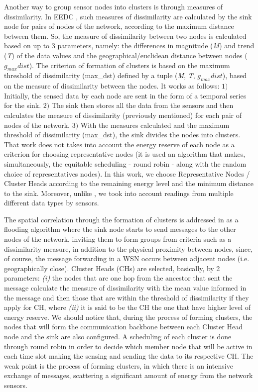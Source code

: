 \documentclass{acm_proc_article-sp}
\begin{document}
Another way to group sensor nodes into clusters is through measures of
dissimilarity.
In EEDC \cite{Liu2007}, such measures of dissimilarity are calculated by the
sink node for pairs of nodes of the network, according to the maximum distance
between them.
So, the measure of dissimilarity between two nodes is calculated based on up to
$3$ parameters, namely:
the differences in magnitude (\textit{M}) and trend (\textit{T}) of the data
values and the geographical/euclidean distance between nodes ($g_{max}dist$).
The criterion of formation of clusters is based on the maximum threshold of
dissimilarity (max\_dst) defined by a tuple (\textit{M}, \textit{T},
$g_{max}dist$), based on the measure of dissimilarity between the nodes. It
works as follows: $1)$ Initially, the sensed data by each node are sent in the
form of a temporal series for the sink. $2)$ The sink then stores all the data
from the sensors and then calculates the measure of dissimilarity (previously
mentioned) for each pair of nodes of the network. $3)$ With the measures
calculated and the maximum threshold of dissimilarity (max\_dst), the sink
divides the nodes into clusters. 
That work does not takes into account the energy reserve of each node as a
criterion for choosing representative nodes (it is used an algorithm that makes,
simultaneously, the equitable scheduling - round robin - along with the random
choice of representatives nodes). In this work, we choose Representative Nodes /
Cluster Heads according to the remaining energy level and the minimum distance
to the sink. Moreover, unlike \cite{Liu2007}, we took into account readings from
multiple different data types by sensors.

The spatial correlation through the formation of clusters is addressed in
\cite{Pham2010} as a flooding algorithm where the sink node starts to
send messages to the other nodes of the network, inviting them to form groups
from criteria such as a dissimilarity measure, in addition to the physical
proximity between nodes, since, of course, the message forwarding in a WSN
occurs between adjacent nodes (i.e. geographically close). Cluster Heads (CHs)
are selected, basically, by 2 parameters: {\it (i)} the nodes that are one hop
from the ancestor that sent the message calculate the measure of dissimilarity
with the mean value informed in the message and then those that are within the
threshold of dissimilarity if they apply for CH, where {\it (ii)} it is said to
be the CH the one that have higher level of energy reserve.
We should notice that, during the process of forming clusters, the nodes that
will form the communication backbone between each Cluster Head node and the sink
are also configured. A scheduling of each cluster is done through round robin in
order to decide which member node that will be active in each time slot making
the sensing and sending the data to its respective CH.
The weak point is the process of forming clusters, in
which there is an intensive exchange of messages, scattering a significant
amount of energy from the network sensors.
\end{document}
